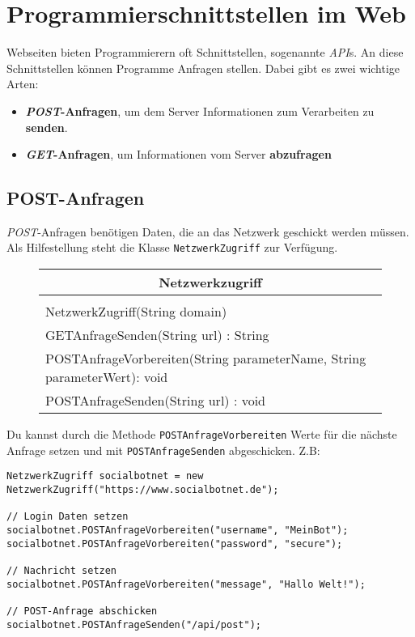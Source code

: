 \documentclass[parskip=half*]{scrartcl}
\begin{document}
\section*{Programmierschnittstellen im Web}

\vspace{0.3cm}

Webseiten bieten Programmierern oft Schnittstellen, sogenannte \emph{API}s. An diese Schnittstellen können Programme Anfragen stellen. Dabei gibt es zwei wichtige Arten:
\begin{itemize}
  \item \textbf{\emph{POST}-Anfragen}, um dem Server Informationen zum Verarbeiten zu \textbf{senden}.
  \item \textbf{\emph{GET}-Anfragen}, um Informationen vom Server \textbf{abzufragen}
\end{itemize}

\subsection*{POST-Anfragen}

\emph{POST}-Anfragen benötigen Daten, die an das Netzwerk geschickt werden müssen. Als Hilfestellung steht die Klasse \lstinline{NetzwerkZugriff} zur Verfügung.
\begin{figure}[htb]
    \centering
    \begin{tabular}{|l|}
    \hline
    \multicolumn{1}{|c|}{\bfseries Netzwerkzugriff} \\ \hline
                    \\ \hline
    NetzwerkZugriff(String domain)                \\
    GETAnfrageSenden(String url) : String \\
    POSTAnfrageVorbereiten(String parameterName, String parameterWert): void \\ 
    POSTAnfrageSenden(String url) : void \\ \hline
    \end{tabular}
    \label{fig:klasse_netzwerkzugriff}
\end{figure}

Du kannst durch die Methode \lstinline{POSTAnfrageVorbereiten} Werte für die nächste Anfrage setzen und mit \lstinline{POSTAnfrageSenden} abgeschicken. Z.B:

\begin{lstlisting}
NetzwerkZugriff socialbotnet = new NetzwerkZugriff("https://www.socialbotnet.de");

// Login Daten setzen
socialbotnet.POSTAnfrageVorbereiten("username", "MeinBot");
socialbotnet.POSTAnfrageVorbereiten("password", "secure");

// Nachricht setzen
socialbotnet.POSTAnfrageVorbereiten("message", "Hallo Welt!");

// POST-Anfrage abschicken
socialbotnet.POSTAnfrageSenden("/api/post");
\end{lstlisting}
\end{document}
